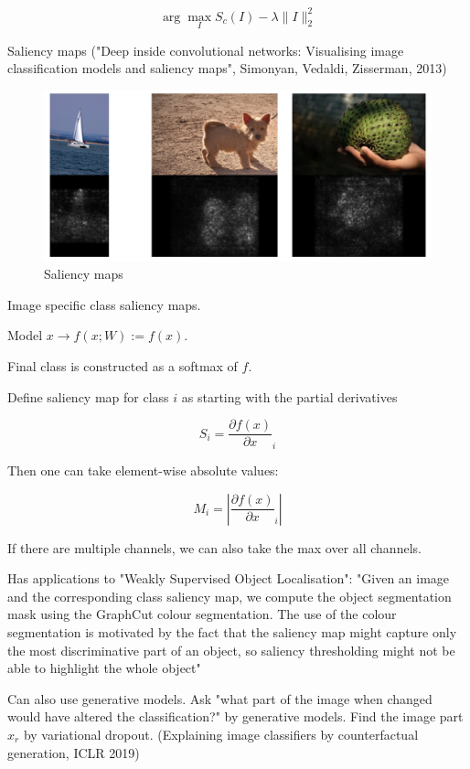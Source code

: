 \documentclass[english]{article}
\begin{document}
$$\arg\max_I
S_c(I) - \lambda \|I\|_2^2 
$$

\item  Saliency maps ("Deep inside convolutional networks: Visualising image classification models and saliency maps", Simonyan, Vedaldi, Zisserman, 2013)


\begin{figure}
  \centering
  \includegraphics[width=\textwidth]{saliency.png}
  \caption{Saliency maps}
  \label{saliency}
\end{figure}


Image specific class saliency maps. 

Model $x \to f(x;W):=f(x)$. 

Final class is constructed as a softmax of $f$.

Define saliency map for class $i$ as starting with the partial derivatives

$$S_i = \frac{\partial f(x)}{\partial x}_i$$

Then one can take element-wise absolute values: 

$$M_i = |\frac{\partial f(x)}{\partial x}_i|$$

If there are multiple channels, we can also take the max over all channels.

Has applications to "Weakly Supervised Object Localisation":  "Given an image and the corresponding class saliency map, we compute the object segmentation mask
using the GraphCut colour segmentation. The use of the colour segmentation is motivated by the
fact that the saliency map might capture only the most discriminative part of an object, so saliency
thresholding might not be able to highlight the whole object"

\item Can also use generative models. Ask "what part of the image when changed would have altered the classification?" by generative models. Find the image part $x_r$ by variational dropout. (Explaining image classifiers by counterfactual generation, ICLR 2019) 
\end{document}
